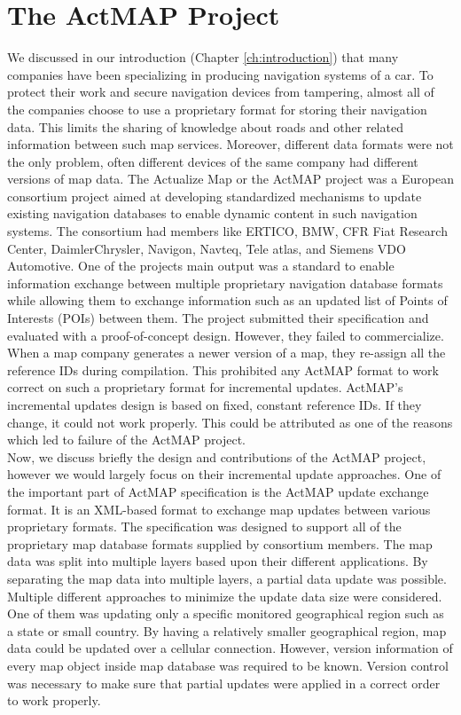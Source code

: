\section{The ActMAP Project}
We discussed in our introduction (Chapter \ref{ch:introduction}) that many companies have been specializing in producing navigation systems of a car. To protect their work and secure navigation devices from tampering, almost all of the companies choose to use a proprietary format for storing their navigation data. This limits the sharing of knowledge about roads and other related information between such map services. Moreover, different data formats were not the only problem, often different devices of the same company had different versions of map data. The Actualize Map or the ActMAP project \cite{flament2003actmap} was a European consortium project aimed at developing standardized mechanisms to update existing navigation databases to enable dynamic content in such navigation systems. The consortium had members like ERTICO, BMW, CFR Fiat Research Center, DaimlerChrysler, Navigon, Navteq, Tele atlas, and Siemens VDO Automotive. One of the projects main output was a standard to enable information exchange between multiple proprietary navigation database formats while allowing them to exchange information such as an updated list of Points of Interests (POIs) between them. The project submitted their specification \cite{flament2003actmap} and evaluated with a proof-of-concept design. However, they failed to commercialize. When a map company generates a newer version of a map, they re-assign all the reference IDs during compilation. This prohibited any ActMAP format to work correct on such a proprietary format for incremental updates. ActMAP's incremental updates design is based on fixed, constant reference IDs. If they change, it could not work properly. This could be attributed as one of the reasons which led to failure of the ActMAP project.\\

Now, we discuss briefly the design and contributions of the ActMAP project, however we would largely focus on their incremental update approaches. One of the important part of ActMAP specification is the ActMAP update exchange format. It is an XML-based format to exchange map updates between various proprietary formats. The specification was designed to support all of the proprietary map database formats supplied by consortium members. The map data was split into multiple layers based upon their different applications. By separating the map data into multiple layers, a partial data update was possible. Multiple different approaches to minimize the update data size were considered. One of them was updating only a specific monitored geographical region such as a state or small country. By having a relatively smaller geographical region, map data could be updated over a cellular connection. However, version information of every map object inside map database was required to be known. Version control was necessary to make sure that partial updates were applied in a correct order to work properly. \\

